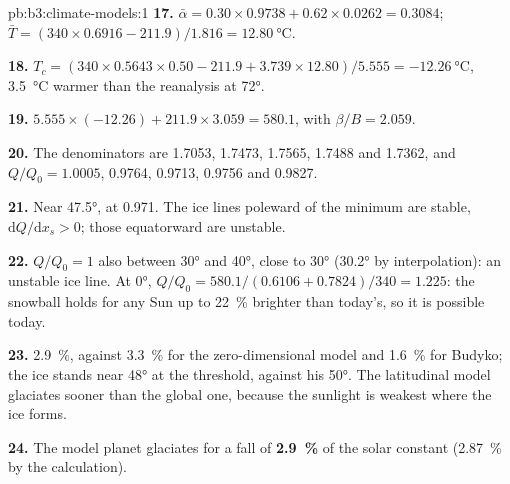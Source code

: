 \begin{solution}{pb:b3:climate-models:1}
\textbf{17.} $\bar\alpha = 0.30\times0.9738 + 0.62\times0.0262 =
\num{0.3084}$; $\bar T = (340\times0.6916 - 211.9)/1.816 =
\qty{12.80}{\celsius}$.

\textbf{18.} $T_c = (340\times0.5643\times0.50 - 211.9 + 3.739\times12.80)/
5.555 = \qty{-12.26}{\celsius}$, \qty{3.5}{\celsius} warmer than the
reanalysis at \ang{72}.

\textbf{19.} $5.555\times(-12.26) + 211.9\times3.059 = \num{580.1}$, with
$\beta/B = \num{2.059}$.

\textbf{20.} The denominators are 1.7053, 1.7473, 1.7565, 1.7488 and
1.7362, and $Q/Q_0 = \num{1.0005}$, \num{0.9764}, \num{0.9713},
\num{0.9756} and \num{0.9827}.

\textbf{21.} Near \ang{47.5}, at \num{0.971}. The ice lines poleward of the
minimum are stable, $\mathrm dQ/\mathrm dx_s > 0$; those equatorward are
unstable.

\textbf{22.} $Q/Q_0 = 1$ also between \ang{30} and \ang{40}, close to
\ang{30} (\ang{30.2} by interpolation): an unstable ice line. At \ang{0},
$Q/Q_0 = 580.1/(0.6106 + 0.7824)/340 = \num{1.225}$: the snowball holds
for any Sun up to \qty{22}{\percent} brighter than today's, so it is
possible today.

\textbf{23.} \qty{2.9}{\percent}, against \qty{3.3}{\percent} for the
zero-dimensional model and \qty{1.6}{\percent} for Budyko; the ice stands
near \ang{48} at the threshold, against his \ang{50}. The latitudinal model
glaciates sooner than the global one, because the sunlight is weakest where
the ice forms.

\textbf{24.} The model planet glaciates for a fall of
\textbf{\qty[text-series-to-math=true]{2.9}{\percent}} of the solar
constant (\qty{2.87}{\percent} by the calculation).
\end{solution}

